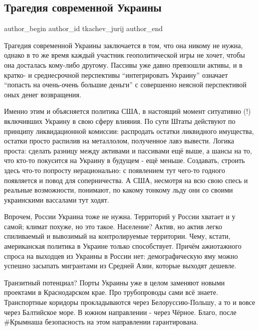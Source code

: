  
 
 
 
 
 
\subsection{Трагедия современной Украины}
\label{sec:14_02_2022.tg.tkachev_jurij.1.tragedia_sovremennoj_ukrainy}
 
\ifcmt
 author_begin
   author_id tkachev_jurij
 author_end
\fi

Трагедия современной Украины заключается в том, что она никому не нужна, однако
в то же время каждый участник геополитической игры не хочет, чтобы она
досталась кому-либо другому. Пассивы уже давно превзошли активы, и в кратко- и
среднесрочной перспективы \enquote{интегрировать Украину} означает \enquote{попасть на
очень-очень большие деньги} с совершенно неясной перспективой оных денег
возвращения. 

Именно этим и объясняется политика США, в настоящий момент ситуативно (!)
включивших Украину в свою сферу влияния. По сути Штаты действуют по принципу
ликвидационной комиссии: распродать остатки ликвидного имущества, остатки
просто распилив на металлолом, полученное лавэ вывести. Логика проста: сделать
разницу между активами и пассивами ещё выше, а шансы на то, что кто-то
покусится на Украину в будущем - ещё меньше. Создавать, строить здесь что-то
попросту нерационально: с появлением тут чего-то годного появляется и повод для
соперничества. А США, несмотря на всю свою спесь и реальные возможности,
понимают, по какому тонкому льду они со своими украинскими вассалами тут ходят.

Впрочем, России Украина тоже не нужна. Территорий у России хватает и у самой;
климат похуже, но это такое. Население? Актив, но актив легко спиливаемый и
вывозимый на контролируемые территории. Чему, кстати, американская политика в
Украине только способствует. Причём ажиотажного спроса на выходцев из Украины в
России нет: демографическую яму можно успешно засыпать мигрантами из Средней
Азии, которые выходят дешевле.

Транзитный потенциал? Порты Украины уже в целом заменяют новыми проектами в
Краснодарском крае. Про трубопроводы сами всё знаете. Транспортные коридоры
прокладываются через Белоруссию-Польшу, а то и вовсе через Балтийское море. В
южном направлении - через Чёрное. Благо, после \#Крымнаша безопасность на этом
направлении гарантирована.

